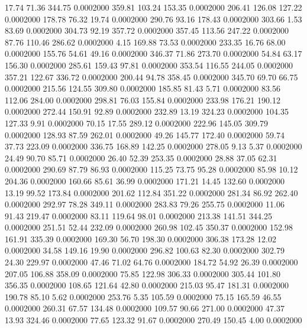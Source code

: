   17.74   71.36  344.75   0.0002000
 359.81  103.24  153.35   0.0002000
 206.41  126.08  127.22   0.0002000
 178.78   76.32   19.74   0.0002000
 290.76   93.16  178.43   0.0002000
 303.66    1.53   83.69   0.0002000
 304.73   92.19  357.72   0.0002000
 357.45  113.56  247.22   0.0002000
  87.76  110.46  286.62   0.0002000
   4.15  169.88   73.53   0.0002000
 233.35   16.76   68.00   0.0002000
 155.76   54.61   49.16   0.0002000
 346.37   71.86  273.70   0.0002000
  54.84   63.17  156.30   0.0002000
 285.61  159.43   97.81   0.0002000
 353.54  116.55  244.05   0.0002000
 357.21  122.67  336.72   0.0002000
 200.44   94.78  358.45   0.0002000
 345.70   69.70   66.75   0.0002000
 215.56  124.55  309.80   0.0002000
 185.85   81.43    5.71   0.0002000
  83.56  112.06  284.00   0.0002000
 298.81   76.03  155.84   0.0002000
 233.98  176.21  190.12   0.0002000
 272.44  150.91   92.89   0.0002000
 232.89   13.19  324.23   0.0002000
 104.35  127.33    9.91   0.0002000
  70.15   17.55  289.12   0.0002000
 222.96  145.05  309.79   0.0002000
 128.93   87.59  262.01   0.0002000
  49.26  145.77  172.40   0.0002000
  59.74   37.73  223.09   0.0002000
 336.75  168.89  142.25   0.0002000
 278.05    9.13    5.37   0.0002000
  24.49   90.70   85.71   0.0002000
  26.40   52.39  253.35   0.0002000
  28.88   37.05   62.31   0.0002000
 290.69   87.79   86.93   0.0002000
 115.25   73.75   95.28   0.0002000
  85.98   10.12  204.36   0.0002000
 160.66   85.61   36.99   0.0002000
 171.21   14.45  132.60   0.0002000
  13.19   99.52  173.84   0.0002000
 201.62  112.84  351.22   0.0002000
 281.34   86.92  262.40   0.0002000
 292.97   78.28  349.11   0.0002000
 283.83   79.26  255.75   0.0002000
  11.06   91.43  219.47   0.0002000
  83.11  119.64   98.01   0.0002000
 213.38  141.51  344.25   0.0002000
 251.51   52.44  232.09   0.0002000
 260.98  102.45  350.37   0.0002000
 152.98  161.91  335.39   0.0002000
 169.30   56.70  198.30   0.0002000
 306.38  173.28   12.02   0.0002000
  34.58  149.16   19.90   0.0002000
 296.82  100.63   82.30   0.0002000
 302.79   24.30  229.97   0.0002000
  47.46   71.02   64.76   0.0002000
 184.72   54.92   26.39   0.0002000
 207.05  106.88  358.09   0.0002000
  75.85  122.98  306.33   0.0002000
 305.44  101.80  356.35   0.0002000
 108.65  121.64   42.80   0.0002000
 215.03   95.47  181.31   0.0002000
 190.78   85.10    5.62   0.0002000
 253.76    5.35  105.59   0.0002000
  75.15  165.59   46.55   0.0002000
 260.31   67.57  134.48   0.0002000
 109.57   90.66  271.00   0.0002000
  47.37   13.93  324.46   0.0002000
  77.65  123.32   91.67   0.0002000
 270.49  150.45    4.00   0.0002000
